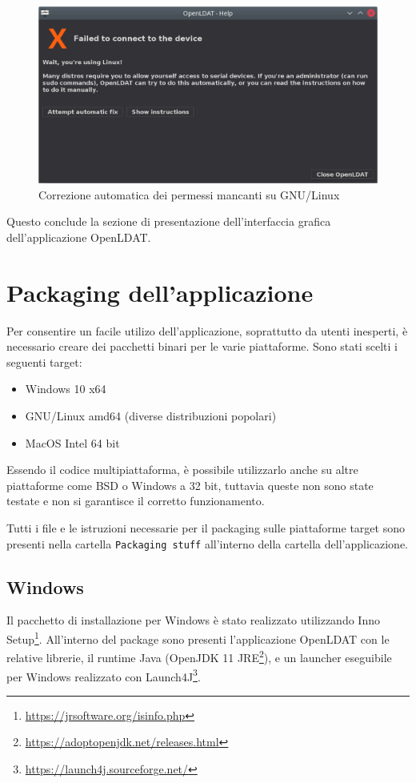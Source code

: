 \begin{figure}[H]
	\centering
	\includegraphics[width=\textwidth]{Applicazione_files/gui_linuxerror.png}
	\caption{Correzione automatica dei permessi mancanti su GNU/Linux}
	\label{fig:gui_linuxerror}
\end{figure}

Questo conclude la sezione di presentazione dell'interfaccia grafica dell'applicazione OpenLDAT.

\section{Packaging dell'applicazione}
Per consentire un facile utilizo dell'applicazione, soprattutto da utenti inesperti, è necessario creare dei pacchetti binari per le varie piattaforme. Sono stati scelti i seguenti target:\begin{itemize}
	\item Windows 10 x64
	\item GNU/Linux amd64 (diverse distribuzioni popolari)
	\item MacOS Intel 64 bit
\end{itemize}
Essendo il codice multipiattaforma, è possibile utilizzarlo anche su altre piattaforme come BSD o Windows a 32 bit, tuttavia queste non sono state testate e non si garantisce il corretto funzionamento.

Tutti i file e le istruzioni necessarie per il packaging sulle piattaforme target sono presenti nella cartella \texttt{Packaging stuff} all'interno della cartella dell'applicazione.

\subsection{Windows}
Il pacchetto di installazione per Windows è stato realizzato utilizzando Inno Setup\footnote{\href{https://jrsoftware.org/isinfo.php}{https://jrsoftware.org/isinfo.php}}. All'interno del package sono presenti l'applicazione OpenLDAT con le relative librerie, il runtime Java (OpenJDK 11 JRE\footnote{\href{https://adoptopenjdk.net/releases.html}{https://adoptopenjdk.net/releases.html}}), e un launcher eseguibile per Windows realizzato con Launch4J\footnote{\href{https://launch4j.sourceforge.net/}{https://launch4j.sourceforge.net/}}.

